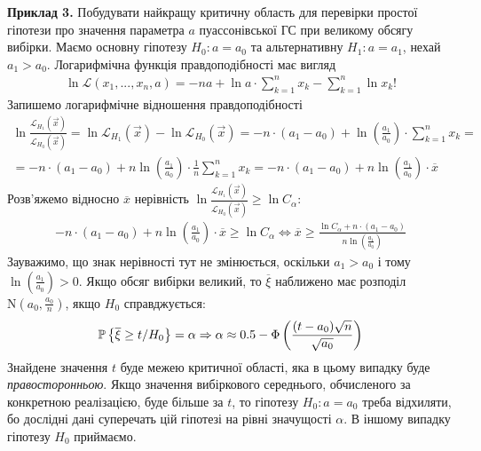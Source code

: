 \vspace{3mm}
\noindent\textbf{Приклад 3.} Побудувати найкращу критичну область для перевірки простої гіпотези про значення параметра $a$
пуассонівської ГС при великому обсягу вибірки.
Маємо основну гіпотезу $H_0 : a = a_0$ та альтернативну $H_1 : a = a_1$, нехай $a_1 > a_0$. Логарифмічна функція правдоподібності має вигляд
\begin{gather*}
    \ln \mathcal{L}(x_1, ..., x_n, a) = -n a + \ln a \cdot \sum\limits_{k=1}^n x_k - \sum\limits_{k=1}^n \ln{x_k!}
\end{gather*}
Запишемо логарифмічне відношення правдоподібності
\begin{gather*}
    \ln \frac{\mathcal{L}_{H_1}(\vec{x})}{\mathcal{L}_{H_0}(\vec{x})} = \ln \mathcal{L}_{H_1}(\vec{x}) - \ln \mathcal{L}_{H_0}(\vec{x}) =
    -n \cdot \left(a_1 - a_0\right) + \ln\left(\frac{a_1}{a_0}\right)\cdot \sum\limits_{k=1}^n x_k = \\
    = -n \cdot \left(a_1 - a_0\right) + n \ln\left(\frac{a_1}{a_0}\right) \cdot \frac{1}{n}\sum\limits_{k=1}^n x_k 
    = -n \cdot \left(a_1 - a_0\right) + n \ln\left(\frac{a_1}{a_0}\right) \cdot \overline{x}
\end{gather*}
Розв'яжемо відносно $\overline{x}$ нерівність $\ln \frac{\mathcal{L}_{H_1}(\vec{x})}{\mathcal{L}_{H_0}(\vec{x})} \geq \ln C_{\alpha}$:
\begin{gather*}
    -n \cdot \left(a_1 - a_0\right) + n \ln\left(\frac{a_1}{a_0}\right) \cdot \overline{x} \geq \ln C_{\alpha} \Leftrightarrow
    \overline{x} \geq \frac{\ln C_{\alpha} + n \cdot \left(a_1 - a_0\right)}{n \ln\left(\frac{a_1}{a_0}\right)}
\end{gather*}
Зауважимо, що знак нерівності тут не змінюється, оскільки $a_1 > a_0$ і тому $\ln\left(\frac{a_1}{a_0}\right) > 0$.
Якщо обсяг вибірки великий, то $\overline{\xi}$ наближено має розподіл $\mathrm{N}\left(a_0, \frac{a_0}{n}\right)$, якщо $H_0$ справджується:
\begin{gather*}
    \P \left\{\overline{\xi} \geq t / H_0 \right\} = \alpha \Rightarrow \alpha \approx 0.5 - \Phi\left(\frac{(t - a_0)\sqrt{n}}{\sqrt{a_0}}\right)
\end{gather*}
Знайдене значення $t$ буде межею критичної області, яка в цьому випадку буде \emph{правосторонньою}.
Якщо значення вибіркового середнього, обчисленого за конкретною 
реалізацією, буде більше за $t$, то гіпотезу $H_0 : a = a_0$ треба відхиляти, бо дослідні дані суперечать цій 
гіпотезі на рівні значущості $\alpha$. В іншому випадку гіпотезу $H_0$ приймаємо.

